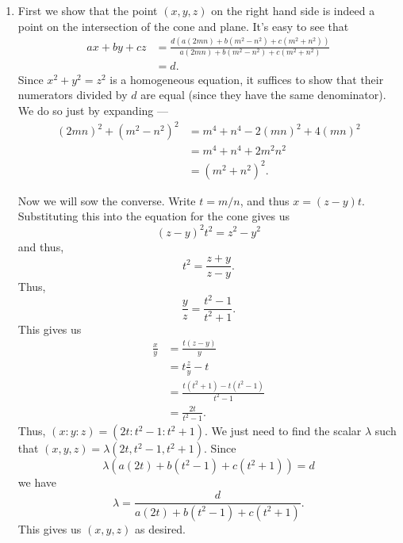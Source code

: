 \documentclass[12 pt, letterpaper]{hmcpset}
\begin{document}
\begin{solution}
	\begin{enumerate}
		\item First we show that the point $(x, y, z)$ on the right hand side is indeed a point on the intersection of the cone and plane. It's easy to see that
			\[
				\begin{split}
					ax + by + cz & = \frac{d(a(2mn) + b(m^{2} - n^{2}) + c(m^{2} + n^{2}))}{a(2mn) + b(m^{2} - n^{2}) + c(m^{2} + n^{2})} \\
						     & = d.
				\end{split}
			\]
			Since $x^{2} + y^{2} = z^{2}$ is a homogeneous equation, it suffices to show that their numerators divided by $d$ are equal (since they have the same denominator). We do so just by expanding ---
			\[
				\begin{split}
					(2mn)^{2} + (m^{2} - n^{2})^{2} & = m^{4} + n^{4} - 2(mn)^{2} + 4(mn)^{2} \\
									& = m^{4} + n^{4} + 2 m^{2} n^{2} \\
									& = (m^{2} + n^{2})^{2}.
				\end{split}
			\]

			Now we will sow the converse. Write $t = m/n$, and thus $x = (z - y) t$. Substituting this into the equation for the cone gives us
			\[
				(z - y)^{2} t^{2} = z^{2} - y^{2}
			\]
			and thus,
			\[
				t^{2} = \frac{z + y}{z - y}.
			\]
			Thus,
			\[
				\frac{y}{z} = \frac{t^{2} - 1}{t^{2} + 1}.
			\]
			This gives us
			\[
				\begin{split}
					\frac{x}{y} & = \frac{t(z - y)}{y} \\
						    & = t \frac{z}{y} - t \\
						    & = \frac{t(t^{2} + 1) - t(t^{2} - 1)}{t^{2} - 1} \\
						    & = \frac{2t}{t^{2} - 1}.
				\end{split}
			\]
			Thus, $(x : y : z) = (2t : t^{2} - 1 : t^{2} + 1)$. We just need to find the scalar $\lambda$ such that $(x, y, z) = \lambda (2t, t^{2} - 1, t^{2} + 1)$. Since
			\[
				\lambda (a (2t) + b(t^{2} - 1) + c(t^{2} + 1)) = d
			\]
			we have
			\[
				\lambda = \frac{d}{a(2t) + b(t^{2} - 1) + c(t^{2} + 1)}.
			\]
			This gives us $(x, y, z)$ as desired.


\end{enumerate}
\end{solution}
\end{document}
